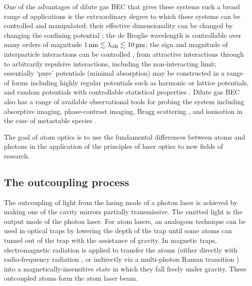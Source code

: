 

One of the advantages of dilute gas BEC that gives these systems such a broad range of applications is the extraordinary degree to which these systems can be controlled and manipulated:  their effective dimensionality can be changed by changing the confining potential \citep{Olshanii:1998,Paredes:2004,Kinoshita:2004}; the de Broglie wavelength is controllable over many orders of magnitude $\unit[1]{nm} \lesssim \lambda_\text{dB} \lesssim \unit[10]{\micro m}$; the sign and magnitude of interparticle interactions can be controlled \citep{Inouye:1998hy}, from attractive interactions through to arbitrarily repulsive interactions, including the non-interacting limit; essentially `pure' potentials (minimal absorption) may be constructed in a range of forms including highly regular potentials such as harmonic or lattice potentials, and random potentials with controllable statistical properties \citep{Damski:2003,Lye:2005,Clement:2005,Fort:2005,Schulte:2005}.  Dilute gas BEC also has a range of available observational tools for probing the system \citep{Ketterle:1999fk} including absorptive imaging, phase-contrast imaging, Bragg scattering \citep{Stenger:1999a}, and ionisation in the case of metastable species \citep{Robert:2001}.  

The goal of atom optics is to use the fundamental differences between atoms and photons in the application of the principles of laser optics to new fields of research.

\subsection{The outcoupling process}

The outcoupling of light from the lasing mode of a photon laser is achieved by making one of the cavity mirrors partially transmissive.  The emitted light is the output mode of the photon laser.  For atom lasers, an analogous technique can be used in optical traps by lowering the depth of the trap until some atoms can tunnel out of the trap with the assistance of gravity.  In magnetic traps, electromagnetic radiation is applied to transfer the atoms (either directly with radio-frequency radiation \citep{Mewes:1997,Bloch:1999mi}, or indirectly via a multi-photon Raman transition \citep{Moy:1997,Hagley:1999dz,Robins:2006fk}) into a magnetically-insensitive state in which they fall freely under gravity.  These outcoupled atoms form the atom laser beam.

